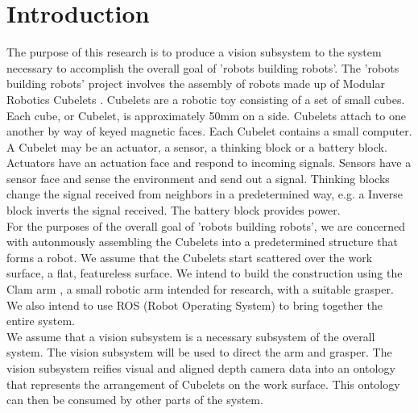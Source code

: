 \documentclass[conference]{IEEEtran}
\begin{document}



%
\IEEEpeerreviewmaketitle



\section{Introduction}
The purpose of this research is to produce a vision subsystem to the system necessary to accomplish the overall goal of 'robots building robots'.  The 'robots building robots' project involves the assembly of robots made up of Modular Robotics Cubelets 
\cite{Cubelets}. Cubelets are a robotic toy consisting of a set of small cubes. Each cube, or Cubelet, is approximately 50mm on a side. Cubelets attach to one another by way of keyed magnetic faces. Each Cubelet contains a small computer. A Cubelet may be an actuator, a sensor, a thinking block or a battery block. Actuators have an actuation face and respond to incoming signals. Sensors have a sensor face and sense the environment and send out a signal. Thinking blocks change the signal received from neighbors in a predetermined way, e.g. a Inverse block inverts the signal received. The battery block provides power.\\

For the purposes of the overall goal of 'robots building robots', we are concerned with autonmously assembling the Cubelets into a predetermined structure that forms a robot. We assume that the Cubelets start scattered over the work surface, a flat, featureless surface. We intend to build the construction using the Clam arm \cite{Clam}, a small robotic arm intended for research, with a suitable grasper. We also intend to use ROS (Robot Operating System) \cite{ROS} to bring together the entire system.\\

We assume that a vision subsystem is a necessary subsystem of the overall system. The vision subsystem will be used to direct the arm and grasper. The vision subsystem reifies visual and aligned depth camera data into an ontology that represents the arrangement of Cubelets on the work surface. This ontology can then be consumed by other parts of the system.\\
\end{document}
